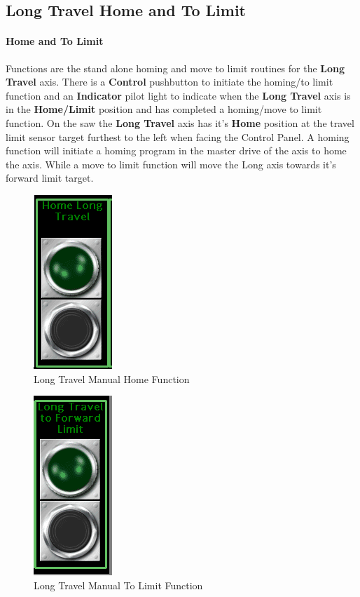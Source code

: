 \subsection{Long Travel Home and To Limit}\paragraph*{Home and To Limit}Functions are the stand alone homing and move to limit routines for the \textbf{Long Travel} axis. There is a \textbf{Control} pushbutton to initiate the homing/to limit function and an \textbf{Indicator} pilot light to indicate when the \textbf{Long Travel} axis is in the \textbf{Home/Limit} position and has completed a homing/move to limit function. On the saw the \textbf{Long Travel} axis has it's \textbf{Home} position at the travel limit sensor target furthest to the left when facing the Control Panel. A homing function will initiate a homing program in the master drive of the axis to home the axis. While a move to limit function will move the Long axis towards it's forward limit target. 
\begin{figure}
	\centering
	\includegraphics[width=.2\linewidth]{screen-captures/manual/long-manual-home}
	\caption{Long Travel Manual Home Function}
	\label{fig:long-manual-home}
\end{figure}
\begin{figure}
	\centering
	\includegraphics[width=.2\linewidth]{screen-captures/manual/long-manual-tolim}
	\caption{Long Travel Manual To Limit Function}
	\label{fig:long-manual-tolim}
\end{figure}
\pagebreak

